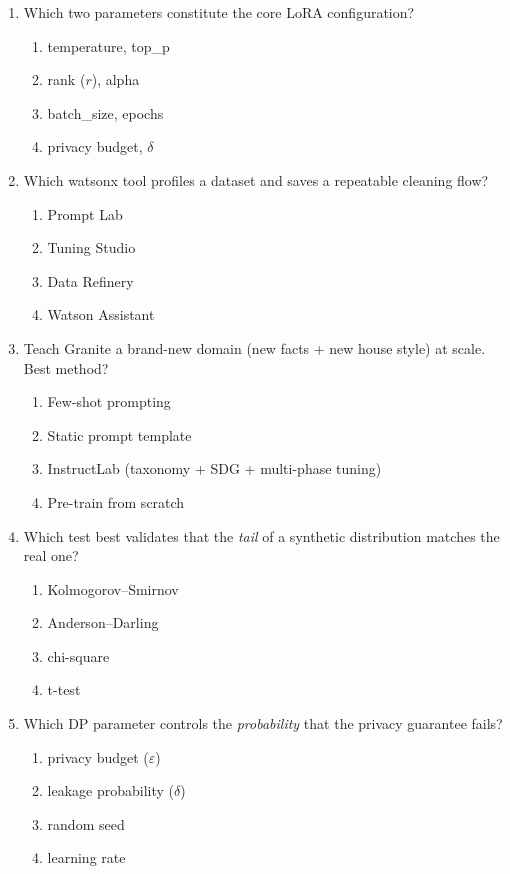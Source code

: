 \begin{enumerate}[leftmargin=*]
\item Which two parameters constitute the core LoRA configuration?
\begin{enumerate}[label=\Alph*.]
  \item temperature, top\_p \item rank ($r$), alpha
  \item batch\_size, epochs \item privacy budget, $\delta$
\end{enumerate}

\item Which watsonx tool profiles a dataset and saves a repeatable cleaning flow?
\begin{enumerate}[label=\Alph*.]
  \item Prompt Lab \item Tuning Studio \item Data Refinery \item Watson Assistant
\end{enumerate}

\item Teach Granite a brand-new domain (new facts + new house style) at scale. Best method?
\begin{enumerate}[label=\Alph*.]
  \item Few-shot prompting \item Static prompt template
  \item InstructLab (taxonomy + SDG + multi-phase tuning) \item Pre-train from scratch
\end{enumerate}

\item Which test best validates that the \emph{tail} of a synthetic distribution matches the real one?
\begin{enumerate}[label=\Alph*.]
  \item Kolmogorov--Smirnov \item Anderson--Darling
  \item chi-square \item t-test
\end{enumerate}

\item Which DP parameter controls the \emph{probability} that the privacy guarantee fails?
\begin{enumerate}[label=\Alph*.]
  \item privacy budget ($\varepsilon$) \item leakage probability ($\delta$)
  \item random seed \item learning rate
\end{enumerate}


\end{enumerate}
